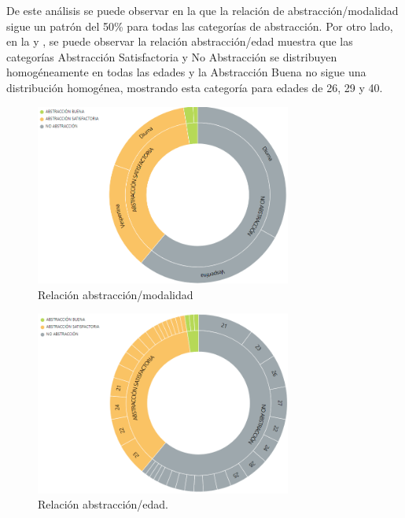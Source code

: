 \documentclass[spanish]{textolivre}
\begin{document}
De este análisis se puede observar en la  que la relación de abstracción/modalidad sigue un patrón del 50\% para todas las categorías de abstracción. Por otro lado, en la  y , se puede observar la relación abstracción/edad muestra que las categorías Abstracción Satisfactoria y No Abstracción se distribuyen homogéneamente en todas las edades y la Abstracción Buena no sigue una distribución homogénea, mostrando esta categoría para edades de 26, 29 y 40.

\begin{figure}[htbp]
 \centering
 \includegraphics[width=0.75\textwidth]{figura3.png}
 \caption{Relación abstracción/modalidad}
 \label{figura 3}
\end{figure}

\begin{figure}[htbp]
 \centering
 \includegraphics[width=0.75\textwidth]{figura4.png}
 \caption{Relación abstracción/edad.}
 \label{figura 4}
\end{figure}
\end{document}
